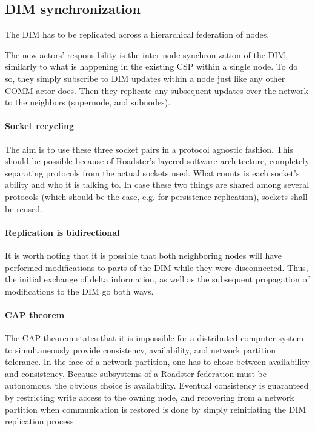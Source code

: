 \subsection{DIM synchronization}
The DIM has to be replicated across a hierarchical federation of nodes.

The new actors' responsibility is the inter-node synchronization of the DIM,
similarly to what is happening in the existing \gls{CSP} within a single node.
To do so, they simply subscribe to DIM updates within a node just like any
other COMM actor does.  Then they replicate any subsequent updates over the network
to the neighbors (supernode, and subnodes).

\paragraph{Socket recycling}
The aim is to use these three socket pairs in a protocol agnostic fashion. This
should be possible because of Roadster's layered software architecture,
completely separating protocols from the actual sockets used. What counts is
each socket's ability and who it is talking to. In case these two things are shared
among several protocols (which should be the case, e.g. for persistence
replication), sockets shall be reused.

\paragraph{Replication is bidirectional}
It is worth noting that it is possible that both neighboring nodes will have performed
modifications to parts of the DIM while they were
disconnected. Thus, the initial exchange of delta information, as well as the
subsequent propagation of modifications to the DIM go both ways.

\paragraph{CAP theorem}
The CAP theorem \cite{wp:cap} states that it is impossible for a distributed
computer system to simultaneously provide consistency, availability, and
network partition tolerance. In the face of a network partition, one has to
chose between availability and consistency. Because subsystems of a Roadster
federation must be autonomous, the obvious choice is availability. Eventual
consistency is guaranteed by restricting write access to the owning node, and
recovering from a network partition when communication is restored is done by
simply reinitiating the DIM replication process.

